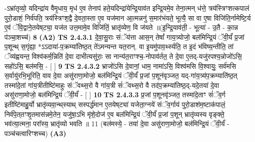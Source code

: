 \documentclass[17pt]{extarticle}
\begin{document}
                  -ऽभ्रा॑तृव्यो॒ यदिन्द्रा॑य वैमृ॒धाय॒ मृध॑ ए॒व तेनाप॑ हते॒यदिन्द्रा॑येन्द्रि॒याव॑त इन्द्रि॒यमे॒व तेना॒त्मन् ध॑त्ते॒ त्रय॑स्त्रिꣳशत्कपालं पुरो॒डाशं॒ निर्व॑पति॒ त्रय॑स्त्रिꣳश॒द्वै दे॒वता॒स्ता ए॒व यज॑मान आ॒त्मन्ननु॑ स॒मार॑भंयते॒ भूत्यै॒ सा वा ए॒षा विजि॑ति॒र्नामेष्टि॒र्य ए॒वं ॅवि॒द्वाने॒तयेष्‌ट्या॒ यज॑त उत्त॒मामे॒व विजि॑तिं॒ भ्रातृ॑व्येण॒ वि ज॑यते ॥(इ॒न्द्रि॒याव॑ती॒ - भूत्या॑ - उ॒तै - का॒न्न प॑ञ्चा॒शच्च॑) \textbf{  8} \newline
                  \newline
                       \textbf{(A2)} \newline \newline
                                        \textbf{ TS 2.4.3.1} \newline
                  दे॒वा॒सु॒राः संॅय॑त्ता आस॒न् तेषां᳚ गाय॒त्र्योजो॒ बल॑मिन्द्रि॒यं ॅवी॒र्यं॑ प्र॒जां प॒शून्थ् स॒गृंह्या॒ *ऽऽदाया॑-प॒क्रम्या॑तिष्ठ॒त् ते॑ऽमन्यन्त यत॒रान्. वा इ॒यमु॑पाव॒र्थ्स्यति॒ त इ॒दं भ॑विष्य॒न्तीति॒ तां ॅव्य॑ह्वयन्त॒ विश्व॑कर्म॒न्निति॑ दे॒वा दाभीत्यसु॑राः॒ सा नान्य॑त॒राꣳश्च॒-नोपाव॑र्तत॒ ते दे॒वा ए॒तद्-यजु॑रपश्य॒न्नोजो॑ऽसि॒ सहो॑ऽसि॒ बल॑मसि॒ - [  ] \textbf{  9} \newline
                  \newline
                                \textbf{ TS 2.4.3.2} \newline
                  भ्राजो॑ऽसि दे॒वानां॒ धाम॒ नामा॑ऽसि॒ विश्व॑मसि वि॒श्वायुः॒ सर्व॑मसि स॒र्वायु॑रभि॒भूरिति॒ वाव दे॒वा असु॑राणा॒मोजो॒ बल॑मिन्द्रि॒यं ॅवी॒र्यं॑ प्र॒जां प॒शून॑वृञ्जत॒ यद्-गा॑य॒त्र्य॑प॒क्रम्याति॑ष्ठ॒त् तस्मा॑दे॒तां गा॑य॒त्रीतीष्टि॑माहुः संॅवथ्स॒रो वै गा॑य॒त्री सं॑ॅवथ्स॒रो वै तद॑प॒क्रम्या॑तिष्ठ॒द्-यदे॒तया॑ दे॒वा असु॑राणा॒मोजो॒ बल॑मिन्द्रि॒यं ॅवी॒र्यं॑ - [  ] \textbf{  10} \newline
                  \newline
                                \textbf{ TS 2.4.3.3} \newline
                   \textbf{ } \newline
                  \newline
                      प्र॒जां प॒शूनवृ॑ञ्जत॒ तस्मा॑दे॒ताꣳ सं॑ॅव॒र्ग इतीष्टि॑माहु॒र्यो भ्रातृ॑व्यवा॒न्थ्‌स्याथ् सस्पर्द्ध॑मान ए॒तयेष्‌ट्या॑ यजेता॒ग्नये॑ संॅव॒र्गाय॑ पुरो॒डाश॑म॒ष्टाक॑पालं॒ निर्व॑पे॒त्‌तꣳशृ॒तमास॑न्नमे॒तेन॒ यजु॑षा॒ऽभि मृ॑शे॒दोज॑ ए॒व बल॑मिन्द्रि॒यं ॅवी॒र्यं॑ प्र॒जां प॒शून् भ्रातृ॑व्यस्य वृङ्क्ते॒ भव॑त्या॒त्मना॒ परा᳚स्य॒ भ्रातृ॑व्यो भवति ॥ 11  (बल॑मस्ये॒ - तया॑ दे॒वा असु॑राणा॒मोजो॒ बल॑मिन्द्रि॒यं ॅवी॒र्यं॑ - पञ्च॑चत्वारिꣳशच्च)  \textbf{(A3)} \newline \newline
\end{document}
